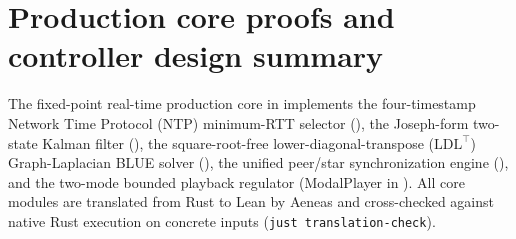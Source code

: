 \documentclass[11pt,a4paper]{article}
\DeclareRobustCommand{\lean}[1]{{\ttfamily\def\_{\textunderscore\allowbreak}#1}}
\theoremstyle{definition}
\begin{document}
\section{Production core proofs and controller design summary}
\label{sec:impl}

The fixed-point real-time production core in 
implements the four-timestamp Network Time Protocol (NTP) minimum-RTT
selector (), the Joseph-form two-state Kalman filter
(), the square-root-free lower-diagonal-transpose
($\mathrm{LDL}^\top$) Graph-Laplacian BLUE solver (), the
unified peer/star synchronization engine (), and the two-mode
bounded playback regulator (\lean{ModalPlayer} in ). All core
modules are translated from Rust to Lean by Aeneas and cross-checked against
native Rust execution on concrete inputs (\texttt{just translation-check}).
\end{document}

